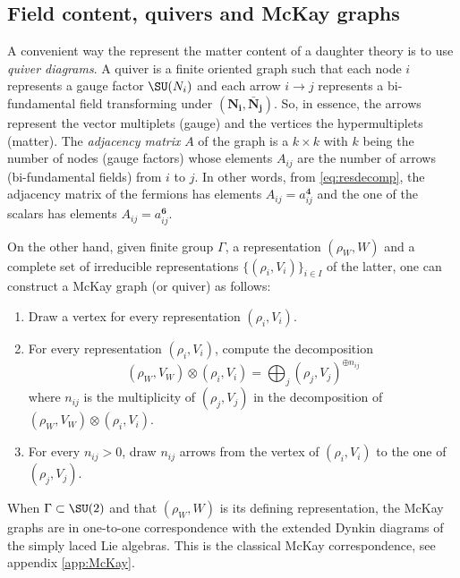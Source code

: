 \documentclass{worksheetclass}
\begin{document}
        \subsection{Field content, quivers and McKay graphs}

            A convenient way the represent the matter content of a daughter theory is to use \emph{quiver diagrams}. A quiver is a finite oriented graph such that each node $i$ represents a gauge factor $\SU(N_i)$ and each arrow $i\to j$ represents a bi-fundamental field transforming under $(\boldsymbol{\textbf{N}_i},\boldsymbol{\bar{\textbf{N}}_j})$. So, in essence, the arrows represent the vector multiplets (gauge) and the vertices the hypermultiplets (matter). The \emph{adjacency matrix} $A$ of the graph is a $k\times k$ with $k$ being the number of nodes (gauge factors) whose elements $A_{ij}$ are the number of arrows (bi-fundamental fields) from $i$ to $j$. In other words, from \eqref{eq:resdecomp}, the adjacency matrix of the fermions has elements $A_{ij}=a^{\boldsymbol{4}}_{ij}$ and the one of the scalars has elements $A_{ij}=a^{\boldsymbol{6}}_{ij}$.

            On the other hand, given finite group $\Gamma$, a representation $(\rho_W,W)$ and a complete set of irreducible representations $\{(\rho_i,V_i)\}_{i\in I}$ of the latter, one can construct a McKay graph (or quiver) as follows:
            \begin{enumerate}
                \item Draw a vertex for every representation $(\rho_i,V_i)$.
                \item For every representation $(\rho_i,V_i)$, compute the decomposition
                \begin{equation*}
                    (\rho_W,V_W)\otimes(\rho_i,V_i)=\bigoplus_j (\rho_j,V_j)^{\oplus n_{ij}}
                \end{equation*}
                where $n_{ij}$ is the multiplicity of $(\rho_j,V_j)$ in the decomposition of $(\rho_W,V_W)\otimes(\rho_i,V_i)$.
                \item For every $n_{ij}>0$, draw $n_{ij}$ arrows from the vertex of $(\rho_i,V_i)$ to the one of $(\rho_j,V_j)$.
            \end{enumerate}
            When $\Gamma\subset\SU(2)$ and that $(\rho_W,W)$ is its defining representation, the McKay graphs are in one-to-one correspondence with the extended Dynkin diagrams of the simply laced Lie algebras. This is the classical McKay correspondence, see appendix \ref{app:McKay}.
            
\end{document}
